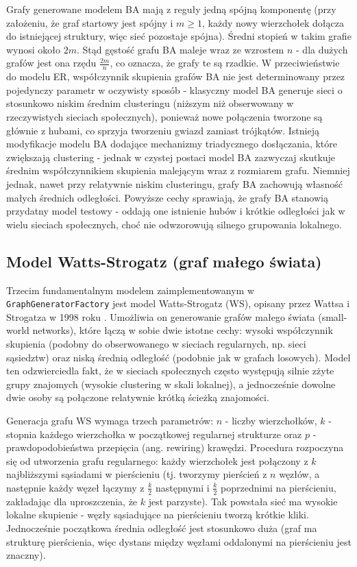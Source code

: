 Grafy generowane modelem BA mają z reguły jedną spójną komponentę (przy założeniu, że graf startowy jest spójny i $m \ge 1$, każdy nowy wierzchołek dołącza do istniejącej struktury, więc sieć pozostaje spójna). Średni stopień w takim grafie wynosi około $2m$. Stąd gęstość grafu BA maleje wraz ze wzrostem $n$ - dla dużych grafów jest ona rzędu $\frac{2m}{n}$, co oznacza, że grafy te są rzadkie. W przeciwieństwie do modelu ER, współczynnik skupienia grafów BA nie jest determinowany przez pojedynczy parametr w oczywisty sposób - klasyczny model BA generuje sieci o stosunkowo niskim średnim clusteringu (niższym niż obserwowany w rzeczywistych sieciach społecznych), ponieważ nowe połączenia tworzone są głównie z hubami, co sprzyja tworzeniu gwiazd zamiast trójkątów. Istnieją modyfikacje modelu BA dodające mechanizmy triadycznego dosłączania, które zwiększają clustering - jednak w czystej postaci model BA zazwyczaj skutkuje średnim współczynnikiem skupienia malejącym wraz z rozmiarem grafu. Niemniej jednak, nawet przy relatywnie niskim clusteringu, grafy BA zachowują własność małych średnich odległości. Powyższe cechy sprawiają, że grafy BA stanowią przydatny model testowy - oddają one istnienie hubów i krótkie odległości jak w wielu sieciach społecznych, choć nie odwzorowują silnego grupowania lokalnego.

\subsection{Model Watts-Strogatz (graf małego świata)}
Trzecim fundamentalnym modelem zaimplementowanym w \texttt{GraphGeneratorFactory} jest model Watts-Strogatz (WS), opisany przez Wattsa i Strogatza w 1998 roku \cite{Watts1998}. Umożliwia on generowanie grafów małego świata (small-world networks), które łączą w sobie dwie istotne cechy: wysoki współczynnik skupienia (podobny do obserwowanego w sieciach regularnych, np. sieci sąsiedztw) oraz niską średnią odległość (podobnie jak w grafach losowych). Model ten odzwierciedla fakt, że w sieciach społecznych często występują silnie zżyte grupy znajomych (wysokie clustering w skali lokalnej), a jednocześnie dowolne dwie osoby są połączone relatywnie krótką ścieżką znajomości.

Generacja grafu WS wymaga trzech parametrów: $n$ - liczby wierzchołków, $k$ - stopnia każdego wierzchołka w początkowej regularnej strukturze oraz $p$ - prawdopodobieństwa przepięcia (ang. rewiring) krawędzi. Procedura rozpoczyna się od utworzenia grafu regularnego: każdy wierzchołek jest połączony z $k$ najbliższymi sąsiadami w pierścieniu (tj. tworzymy pierścień z $n$ węzłów, a następnie każdy węzeł łączymy z $\frac{k}{2}$ następnymi i $\frac{k}{2}$ poprzednimi na pierścieniu, zakładając dla uproszczenia, że $k$ jest parzyste). Tak powstała sieć ma wysokie lokalne skupienie - węzły sąsiadujące na pierścieniu tworzą krótkie kliki. Jednocześnie początkowa średnia odległość jest stosunkowo duża (graf ma strukturę pierścienia, więc dystans między węzłami oddalonymi na pierścieniu jest znaczny).

